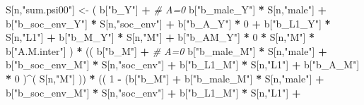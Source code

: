 \documentclass[
]{book}
\newenvironment{Shaded}{\begin{snugshade}}{\end{snugshade}}
\newcommand{\CommentTok}[1]{\textcolor[rgb]{0.56,0.35,0.01}{\textit{#1}}}
\newcommand{\DecValTok}[1]{\textcolor[rgb]{0.00,0.00,0.81}{#1}}
\newcommand{\NormalTok}[1]{#1}
\newcommand{\OtherTok}[1]{\textcolor[rgb]{0.56,0.35,0.01}{#1}}
\newcommand{\SpecialCharTok}[1]{\textcolor[rgb]{0.81,0.36,0.00}{\textbf{#1}}}
\newcommand{\StringTok}[1]{\textcolor[rgb]{0.31,0.60,0.02}{#1}}
\begin{document}
\begin{Shaded}
\begin{Highlighting}[]
\NormalTok{    S[n,}\StringTok{"sum.psi00"}\NormalTok{] }\OtherTok{\textless{}{-}}\NormalTok{  ( b[}\StringTok{"b\_Y"}\NormalTok{] }\SpecialCharTok{+}                                           \CommentTok{\# A=0}
\NormalTok{                             b[}\StringTok{"b\_male\_Y"}\NormalTok{] }\SpecialCharTok{*}\NormalTok{ S[n,}\StringTok{"male"}\NormalTok{] }\SpecialCharTok{+} 
\NormalTok{                             b[}\StringTok{"b\_soc\_env\_Y"}\NormalTok{] }\SpecialCharTok{*}\NormalTok{ S[n,}\StringTok{"soc\_env"}\NormalTok{] }\SpecialCharTok{+} 
\NormalTok{                             b[}\StringTok{"b\_A\_Y"}\NormalTok{] }\SpecialCharTok{*} \DecValTok{0} \SpecialCharTok{+} 
\NormalTok{                             b[}\StringTok{"b\_L1\_Y"}\NormalTok{] }\SpecialCharTok{*}\NormalTok{ S[n,}\StringTok{"L1"}\NormalTok{] }\SpecialCharTok{+}
\NormalTok{                             b[}\StringTok{"b\_M\_Y"}\NormalTok{] }\SpecialCharTok{*}\NormalTok{ S[n,}\StringTok{"M"}\NormalTok{] }\SpecialCharTok{+}
\NormalTok{                             b[}\StringTok{"b\_AM\_Y"}\NormalTok{] }\SpecialCharTok{*} \DecValTok{0} \SpecialCharTok{*}\NormalTok{ S[n,}\StringTok{"M"}\NormalTok{] }\SpecialCharTok{*}\NormalTok{ b[}\StringTok{"A.M.inter"}\NormalTok{] ) }\SpecialCharTok{*}
\NormalTok{      (( b[}\StringTok{"b\_M"}\NormalTok{] }\SpecialCharTok{+}                                                             \CommentTok{\# A\textquotesingle{}=0}
\NormalTok{           b[}\StringTok{"b\_male\_M"}\NormalTok{] }\SpecialCharTok{*}\NormalTok{ S[n,}\StringTok{"male"}\NormalTok{] }\SpecialCharTok{+} 
\NormalTok{           b[}\StringTok{"b\_soc\_env\_M"}\NormalTok{] }\SpecialCharTok{*}\NormalTok{ S[n,}\StringTok{"soc\_env"}\NormalTok{] }\SpecialCharTok{+} 
\NormalTok{           b[}\StringTok{"b\_L1\_M"}\NormalTok{] }\SpecialCharTok{*}\NormalTok{ S[n,}\StringTok{"L1"}\NormalTok{] }\SpecialCharTok{+}
\NormalTok{           b[}\StringTok{"b\_A\_M"}\NormalTok{] }\SpecialCharTok{*} \DecValTok{0}\NormalTok{ )}\SpecialCharTok{\^{}}\NormalTok{( S[n,}\StringTok{"M"}\NormalTok{] )) }\SpecialCharTok{*}
\NormalTok{      (( }\DecValTok{1} \SpecialCharTok{{-}}\NormalTok{ (b[}\StringTok{"b\_M"}\NormalTok{] }\SpecialCharTok{+} 
\NormalTok{                b[}\StringTok{"b\_male\_M"}\NormalTok{] }\SpecialCharTok{*}\NormalTok{ S[n,}\StringTok{"male"}\NormalTok{] }\SpecialCharTok{+} 
\NormalTok{                b[}\StringTok{"b\_soc\_env\_M"}\NormalTok{] }\SpecialCharTok{*}\NormalTok{ S[n,}\StringTok{"soc\_env"}\NormalTok{] }\SpecialCharTok{+} 
\NormalTok{                b[}\StringTok{"b\_L1\_M"}\NormalTok{] }\SpecialCharTok{*}\NormalTok{ S[n,}\StringTok{"L1"}\NormalTok{] }\SpecialCharTok{+}

\end{Highlighting}
\end{Shaded}
\end{document}
